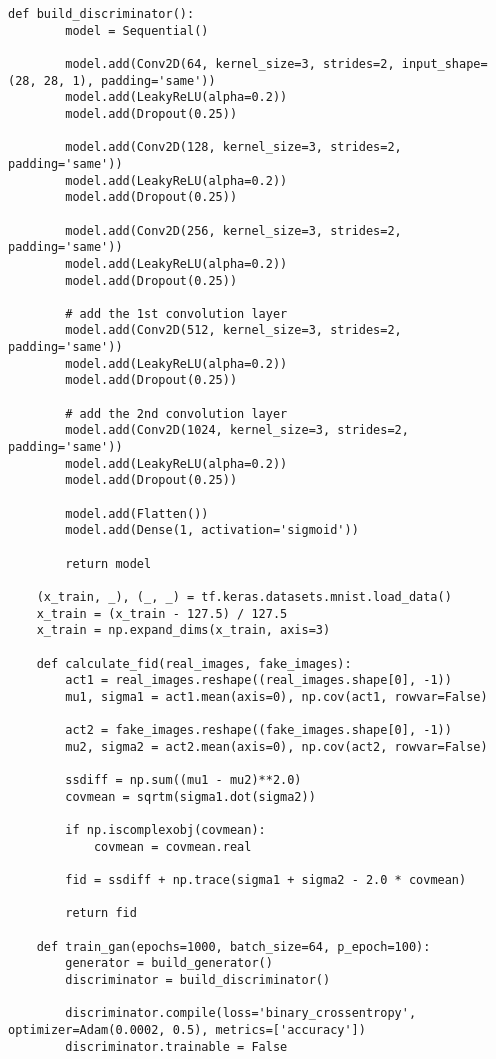 \begin{lstlisting}[style=mypython, caption= {Explore GAN with 6 Convolutional Layers in Generator \\ and 5 Convolutional Layers in Discriminator}]
    def build_discriminator():
        model = Sequential()
        
        model.add(Conv2D(64, kernel_size=3, strides=2, input_shape=(28, 28, 1), padding='same'))
        model.add(LeakyReLU(alpha=0.2))
        model.add(Dropout(0.25))
    
        model.add(Conv2D(128, kernel_size=3, strides=2, padding='same'))
        model.add(LeakyReLU(alpha=0.2))
        model.add(Dropout(0.25))
    
        model.add(Conv2D(256, kernel_size=3, strides=2, padding='same'))
        model.add(LeakyReLU(alpha=0.2))
        model.add(Dropout(0.25))
    
        # add the 1st convolution layer
        model.add(Conv2D(512, kernel_size=3, strides=2, padding='same'))
        model.add(LeakyReLU(alpha=0.2))
        model.add(Dropout(0.25))
    
        # add the 2nd convolution layer
        model.add(Conv2D(1024, kernel_size=3, strides=2, padding='same'))
        model.add(LeakyReLU(alpha=0.2))
        model.add(Dropout(0.25))
    
        model.add(Flatten())
        model.add(Dense(1, activation='sigmoid'))
    
        return model
    
    (x_train, _), (_, _) = tf.keras.datasets.mnist.load_data()
    x_train = (x_train - 127.5) / 127.5
    x_train = np.expand_dims(x_train, axis=3)
    
    def calculate_fid(real_images, fake_images):
        act1 = real_images.reshape((real_images.shape[0], -1))
        mu1, sigma1 = act1.mean(axis=0), np.cov(act1, rowvar=False)
        
        act2 = fake_images.reshape((fake_images.shape[0], -1))
        mu2, sigma2 = act2.mean(axis=0), np.cov(act2, rowvar=False)
        
        ssdiff = np.sum((mu1 - mu2)**2.0)
        covmean = sqrtm(sigma1.dot(sigma2))
        
        if np.iscomplexobj(covmean):
            covmean = covmean.real
        
        fid = ssdiff + np.trace(sigma1 + sigma2 - 2.0 * covmean)
        
        return fid
    
    def train_gan(epochs=1000, batch_size=64, p_epoch=100):
        generator = build_generator()
        discriminator = build_discriminator()
    
        discriminator.compile(loss='binary_crossentropy', optimizer=Adam(0.0002, 0.5), metrics=['accuracy'])
        discriminator.trainable = False
    

\end{lstlisting}
